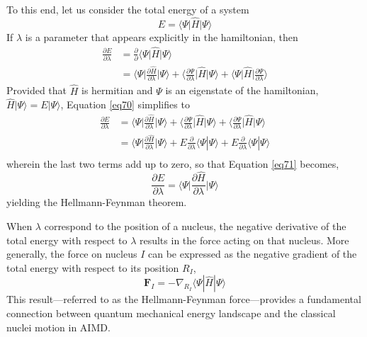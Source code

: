 To this end, let us consider the total energy of a system 
\begin{equation}
	\label{69}
	E = \langle \Psi \big| \hat{H} \big| \Psi \rangle
\end{equation}
If $\lambda$ is a parameter that appears explicitly in the hamiltonian, then 
\begin{equation}
	\label{eq70}
\begin{aligned}
	\frac{\partial E}{\partial \lambda} &= \frac{\partial}{\partial} \langle \Psi \big| \hat{H} \big| \Psi \rangle \\
  &= \bigg\langle \Psi \bigg| \frac{\partial \hat{H}}{\partial \lambda} \bigg| \Psi \bigg\rangle + \bigg\langle \frac{\partial \Psi}{\partial \lambda} \bigg| \hat{H} \bigg| \Psi \bigg\rangle +  \bigg\langle \Psi \bigg| \hat{H} \bigg|  \frac{\partial \Psi}{\partial \lambda}  \bigg\rangle
\end{aligned}
\end{equation}
Provided that $\hat{H}$ is hermitian and $\Psi$ is an eigenstate of the hamiltonian, $\hat{H}|\Psi\rangle = E|\Psi\rangle$,
Equation \ref{eq70} simplifies to
\begin{equation}
    \label{eq71}
    \begin{aligned}
        \frac{\partial E}{\partial \lambda} &= 
    \bigg\langle \Psi \bigg| \frac{\partial \hat{H}}{\partial \lambda} \bigg| \Psi \bigg\rangle + 
    \bigg\langle \frac{\partial \Psi}{\partial \lambda}\bigg| \hat{H} \bigg| \Psi \bigg\rangle +  
    \bigg\langle\frac{\partial \Psi}{\partial \lambda}\bigg|\hat{H}\bigg|\Psi \bigg\rangle \\
    &=\bigg\langle \Psi \bigg| \frac{\partial \hat{H}}{\partial \lambda}
        \bigg| \Psi \bigg\rangle + E\frac{\partial}{\partial \lambda}
        \langle \Psi|\Psi \rangle + E\frac{\partial}{\partial \lambda}
        \langle \Psi|\Psi \rangle \\
    \end{aligned}
\end{equation}
wherein the last two terms add up to zero, so that Equation \ref{eq71} becomes,
\begin{equation}
    \label{eq72}
    \frac{\partial E}{\partial \lambda} = 
    \bigg\langle \Psi \bigg| \frac{\partial \hat{H}}{\partial \lambda} \bigg| \Psi \bigg\rangle 
\end{equation}
yielding the Hellmann-Feynman theorem. 

When $\lambda$ correspond to the position of a nucleus, the negative 
derivative of the total energy with respect to $\lambda$ results 
in the force acting on that nucleus.  More 
generally, the force on nucleus $I$ can be expressed as 
the negative gradient of the total energy with respect to its position $R_I$,
\begin{equation}
    \label{eq73}
    \mathbf{F}_I = -\nabla_{R_I} \langle \Psi | \hat{H} | \Psi \rangle
\end{equation}
This result---referred to as the Hellmann-Feynman force---provides a 
fundamental connection between quantum mechanical energy landscape and the 
classical nuclei motion in AIMD. 
